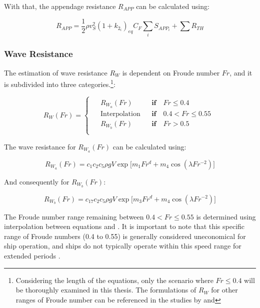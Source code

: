 With that, the appendage resistance $R_{APP}$ can be calculated using:

\begin{equation}\label{eqn:R_app}
    R_{APP} = \frac{1}{2}\rho v_S^2 (1+k_{2_i})_{eq} C_F \sum_i S_{APP_i} + \sum R_{TH}
\end{equation}

\subsubsection*{Wave Resistance}

The estimation of wave resistance $R_W$ is dependent on Froude number $Fr$, and it is subdivided into three categories.\footnote{Considering the length of the equations, only the scenario where $Fr \leqslant 0.4$ will be thoroughly examined in this thesis. The formulations of $R_W$ for other ranges of Froude number can be referenced in the studies by  and }:

\begin{equation}
    \label{eqn:case_Rw}
    R_W(Fr) = 
    \begin{cases}
        \begin{aligned}
        &R_{W_a}(Fr) && \textbf{if} \quad Fr \leqslant 0.4 \\
        &\text{Interpolation} && \textbf{if} \quad 0.4 < Fr \leqslant 0.55 \\
        &R_{W_b}(Fr) && \textbf{if} \quad Fr > 0.5 \\
    \end{aligned}
    \end{cases}
\end{equation}

The wave resistance for $R_{W_a}(Fr)$ can be calculated using:

\begin{equation}\label{eqn:R_w_low}
    R_{W_a}(Fr) = c_1 c_2 c_5 \rho g V  \exp \biggl[ m_1 Fr^d + m_4 \cos(\lambda Fr ^{-2}) \biggr]
\end{equation}

And consequently for $R_{W_b}(Fr)$:

\begin{equation}\label{eqn:R_w_high}
    R_{W_b}(Fr) = c_{17} c_2 c_5 \rho g V  \exp \biggl[ m_3 Fr^d + m_4 \cos(\lambda Fr ^{-2}) \biggr]
\end{equation}

The Froude number range remaining between $0.4 < Fr \leqslant 0.55$ is determined using interpolation between equations  and . It is important to note that this specific range of Froude numbers (0.4 to 0.55) is generally considered uneconomical for ship operation, and ships do not typically operate within this speed range for extended periods .

